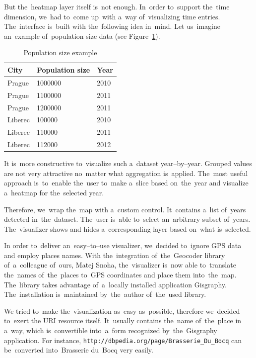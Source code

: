 But the~heatmap layer itself is~not enough. In~order to~support the~time 
dimension, we~had to~come up~with a~way of~visualizing time entries. The~interface is~built with the~following idea in~mind. Let us~imagine an~example of~population size data (see Figure~\ref{fig:impl-pop-ex}).

\begin{table}
  \begin{center}
\begin{tabular}{l|l|l}
  City & Population size & Year \\ \hline
  Prague   &    1000000   &   2010 \\
  Prague   &    1100000   &   2011 \\
  Prague   &    1200000   &   2011 \\
  Liberec   &    100000    &  2010 \\
  Liberec   &    110000    &  2011 \\
  Liberec    &   112000    &  2012
\end{tabular}
\caption{Population size example}
\label{fig:impl-pop-ex}
  \end{center}
\end{table}

It is~more constructive to~visualize such a~dataset year--by--year. Grouped values are 
not very attractive no~matter what aggregation is~applied. The~most useful 
approach is~to~enable the~user to~make a~slice based on~the~year and visualize a~heatmap for the~selected year.

Therefore, we~wrap the~map with a~custom control. It~contains a~list of~years 
detected in~the~dataset. The~user is~able to~select an~arbitrary subset of~years. The~visualizer shows and hides a~corresponding layer based on~what is~selected. 

In order to~deliver an~easy--to--use visualizer, we~decided to~ignore GPS 
data and employ places names. With the~integration of~the~Geocoder library of~a~colleague of~ours, Matej Snoha, the~visualizer is~now able to~translate the~names of~the~places to~GPS coordinates and place them into~the~map. The~library takes 
advantage of~a~locally installed application Gisgraphy. The~installation is~maintained by~the~author of~the~used library.

We tried to~make the~visualization as~easy as~possible, therefore we~decided to~exert the
URI resource itself. It~usually contains the~name of~the~place 
in a~way, which is~convertible into~a~form recognized by~the~Gisgraphy 
application. For instance, \texttt{http://dbpedia.org/page/Brasserie\_Du\_Bocq} 
can be~converted into~Brasserie du~Bocq very easily.

